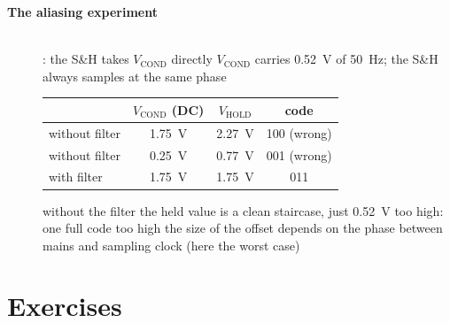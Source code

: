 \begin{description}
\item[{\rot\bf The aliasing experiment}]~\\[-\lblskip]
\bi
	\ite {}: the S\&H takes $V_\mathrm{COND}$ directly
	\ite $V_\mathrm{COND}$ carries \SI{0.52}{\volt} of \SI{50}{\hertz}; the S\&H always samples at the same phase
\ei
\begin{center}
\begin{tabular}{lccc}
\toprule
 & $V_\mathrm{COND}$ (DC) & $V_\mathrm{HOLD}$ & code \\
\midrule
without filter & \SI{1.75}{\volt} & \SI{2.27}{\volt} & 100 (wrong) \\
without filter & \SI{0.25}{\volt} & \SI{0.77}{\volt} & 001 (wrong) \\
with filter & \SI{1.75}{\volt} & \SI{1.75}{\volt} & 011 \\
\bottomrule
\end{tabular}
\end{center}
\bi
	\ite without the filter the held value is a clean staircase, just \SI{0.52}{\volt} too high: one full code too high
	\ite the size of the offset depends on the phase between mains and sampling clock (here the worst case)
\ei
\os{\newpage}
\end{description}

\section{Exercises}

